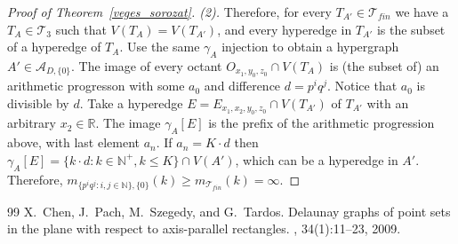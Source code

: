 \documentclass[11pt,oneside]{amsart}
\begin{document}
\begin{proof}[Proof of Theorem~\ref{veges_sorozat}. (2)]
Therefore, for every $T_{A'} \in \mathcal{T}_{fin}$ we have a $T_A \in \mathcal{T}_3$ such that $V(T_A) = V(T_{A'})$, and every hyperedge in $T_{A'}$ is the subset of a hyperedge of $T_A$. Use the same $\gamma_A$ injection to obtain a hypergraph $A' \in \mathcal{A}_{D,\{0\}}$. The image of every octant $O_{x_1,y_0,z_0} \cap V(T_A)$ is (the subset of) an arithmetic progresson with some $a_0$ and difference $d=p^iq^j$. Notice that $a_0$ is divisible by $d$. Take a hyperedge $E = E_{x_1,x_2,y_0,z_0} \cap V(T_{A'})$ of $T_{A'}$ with an arbitrary $x_2 \in \mathbb{R}$. The image $\gamma_A[E]$ is the prefix of the arithmetic progression above, with last element $a_n$. If $a_n = K \cdot d$ then $\gamma_A[E] = \{k \cdot d: k \in \mathbb{N}^+, k \leq K\} \cap V(A')$, which can be a hyperedge in $A'$.
Therefore, $m_{\{p^iq^j:i,j \in \mathbb{N}\},\{0\}}(k) \geq m_{\mathcal{T}_{fin}}(k) = \infty$.
\end{proof}

\begin{thebibliography}{99}
X.~Chen, J.~Pach, M.~Szegedy, and G.~Tardos.
\newblock Delaunay graphs of point sets in the plane with respect to
  axis-parallel rectangles.
, 34(1):11--23, 2009.
\end{thebibliography}
\end{document}
